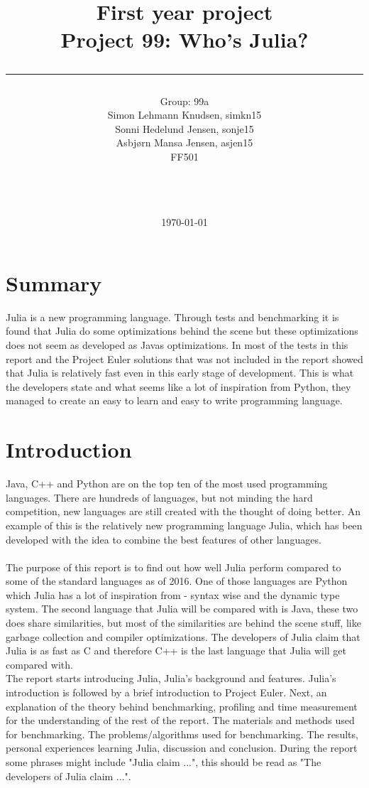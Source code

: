 \documentclass[a4paper, 11pt, titlepage]{article}
\title{First year project\\Project 99: Who's Julia?\\\rule{10cm}{0.5mm}}
\author{Group: 99a\\Simon Lehmann Knudsen, simkn15\\Sonni Hedelund Jensen, sonje15\\Asbjørn Mansa Jensen, asjen15
	\\ FF501\\\rule{5.5cm}{0.5mm}\\}
\date{\today}
\begin{document}
\maketitle

\vfill

\newpage
{}
\section{Summary}
Julia is a new programming language. Through tests and benchmarking it is found that Julia do some optimizations behind the scene but these optimizations does not seem as developed as Javas optimizations. In most of the tests in this report and the Project Euler solutions that was not included in the report showed that Julia is relatively fast even in this early stage of development. This is what the developers state and what seems like a lot of inspiration from Python, they managed to create an easy to learn and easy to write programming language.

\newpage
\tableofcontents

\newpage
{}
\pagestyle{fancy}
\fancyhf{}
\section{Introduction}
Java, C++ and Python are on the top ten of the most used programming languages. There are hundreds of languages, but not minding the hard competition, new languages are still created with the thought of doing better. An example of this is the relatively new programming language Julia, which has been developed with the idea to combine the best features of other languages.\\
\\
The purpose of this report is to find out how well Julia perform compared to some of the standard languages as of 2016. One of those languages are Python which Julia has a lot of inspiration from - syntax wise and the dynamic type system. The second language that Julia will be compared with is Java, these two does share similarities, but most of the similarities are behind the scene stuff, like garbage collection and compiler optimizations. The developers of Julia claim that Julia is as fast as C and therefore C++ is the last language that Julia will get compared with.
\\
The report starts introducing Julia, Julia's background and features. Julia's introduction is followed by a brief introduction to Project Euler. Next, an explanation of the theory behind benchmarking, profiling and time measurement for the understanding of the rest of the report. The materials and methods used for benchmarking. The problems/algorithms used for benchmarking. The results, personal experiences learning Julia, discussion and conclusion. During the report some phrases might include "Julia claim ...", this should be read as "The developers of Julia claim ...".
\end{document}
